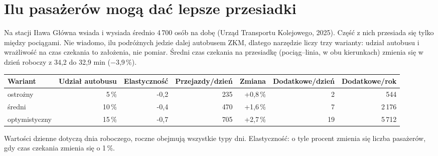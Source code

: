 \documentclass[10pt,a4paper]{article}
\newcommand{\mut}[1]{\textcolor{muted}{#1}}
\begin{document}
\section{Ilu pasażerów mogą dać lepsze przesiadki}
Na stacji Iława Główna wsiada i wysiada średnio 4\,700 osób na dobę (Urząd Transportu Kolejowego, 2025). Część z nich przesiada się tylko między pociągami. Nie wiadomo, ilu podróżnych jedzie dalej autobusem ZKM, dlatego narzędzie liczy trzy warianty: udział autobusu i wrażliwość na czas czekania to założenia, nie pomiar. Średni czas czekania na przesiadkę (pociąg--linia, w obu kierunkach) zmienia się w dzień roboczy z 34,2 do 32,9 min ($-$3,9\,\%).
{\small
\begin{center}\begin{tabular}{@{}l r r r r r r@{}}\toprule
Wariant & Udział autobusu & Elastyczność & Przejazdy/dzień & Zmiana & Dodatkowe/dzień & Dodatkowe/rok \\ \midrule
ostrożny & 5\,\% & -0,2 & 235 & +0,8\,\% & 2 & 544 \\
średni & 10\,\% & -0,4 & 470 & +1,6\,\% & 7 & 2\,176 \\
optymistyczny & 15\,\% & -0,7 & 705 & +2,7\,\% & 19 & 5\,712 \\
\bottomrule\end{tabular}\end{center}}
\mut{\footnotesize Wartości dzienne dotyczą dnia roboczego, roczne obejmują wszystkie typy dni. Elastyczność: o tyle procent zmienia się liczba pasażerów, gdy czas czekania zmienia się o 1\,\%.}
\end{document}
